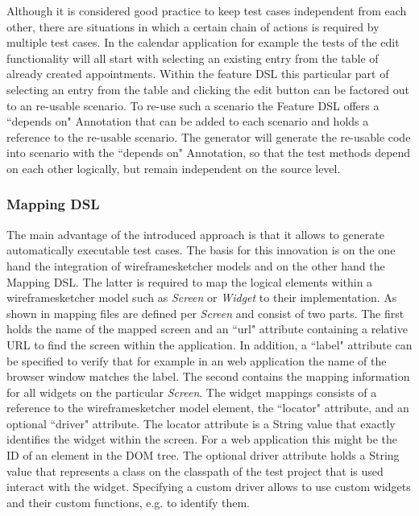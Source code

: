 \documentclass{sig-alternate-05-2015}
\begin{document}
Although it is considered good practice to keep test cases independent from each other, there are situations in which a certain chain of actions is required by multiple test cases.
In the calendar application for example the tests of the edit functionality will all start with selecting an existing entry from the table of already created appointments.
Within the feature DSL this particular part of selecting an entry from the table and clicking the edit button can be factored out to an re-usable scenario.
To re-use such a scenario the Feature DSL offers a ``depends on" Annotation that can be added to each scenario and holds a reference to the re-usable scenario.
The generator will generate the re-usable code into scenario with the ``depends on" Annotation, so that the test methods depend on each other logically, but remain independent on the source level.

\subsubsection{Mapping DSL}
The main advantage of the introduced approach is that it allows to generate automatically executable test cases.
The basis for this innovation is on the one hand the integration of wireframesketcher models and on the other hand the Mapping DSL.
The latter is required to map the logical elements within a wireframesketcher model such as \textit{Screen} or \textit{Widget} to their implementation.
As shown in  mapping files are defined per \textit{Screen} and consist of two parts.
The first holds the name of the mapped screen and an ``url" attribute containing a relative URL to find the screen within the application.
In addition, a ``label" attribute can be specified to verify that for example in an web application the name of the browser window matches the label.
The second contains the mapping information for all widgets on the particular \textit{Screen}.
The widget mappings consists of a reference to the wireframesketcher model element, the ``locator" attribute, and an optional ``driver" attribute.
The locator attribute is a String value that exactly identifies the widget within the screen.
For a web application this might be the ID of an element in the DOM tree.
The optional driver attribute holds a String value that represents a class on the classpath of the test project that is used interact with the widget.
Specifying a custom driver allows to use custom widgets and their custom functions, e.g. to identify them.
\end{document}
